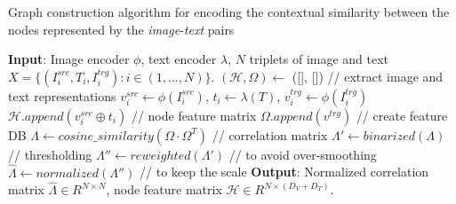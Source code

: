 \documentclass[10pt,twocolumn,letterpaper]{article}
\begin{document}
\begin{algorithm}
	\caption{Graph construction algorithm for encoding the contextual similarity between the nodes represented by the \textit{image}-\textit{text} pairs} 
	\begin{algorithmic}[1]
	    \State \textbf{Input}: Image encoder $\phi$, text encoder $\lambda$, $N$ triplets of image and text $X = \{(I^{src}_i, T_i, I^{trg}_i) : i \in (1,...,N) \}$.
	    \State $(\mathcal{H}, \Omega) \leftarrow$ ([], [])
	        \State \textcolor{light-gray}{// extract image and text representations}
	        \State $v^{src}_i \leftarrow \phi(I^{src}_i)$, $t_i \leftarrow \lambda(T)$, $v^{trg}_i \leftarrow \phi(I^{trg}_i)$
	        \State $\mathcal{H}.append(v^{src}_i \oplus t_i)$ \textcolor{light-gray}{// node feature matrix}      
	        \State $\Omega.append(v^{trg})$ \textcolor{light-gray}{// create feature DB}
	    \EndFor
	    \State $\Lambda \leftarrow cosine\_similarity(\Omega \cdot \Omega^T)$ \textcolor{light-gray}{// correlation matrix}
	    \State $\Lambda' \leftarrow binarized(\Lambda)$ \textcolor{light-gray}{// thresholding}
	    \State $\Lambda'' \leftarrow reweighted(\Lambda')$ \textcolor{light-gray}{// to avoid over-smoothing}
	    \State $\hat{\Lambda} \leftarrow normalized(\Lambda'')$ \textcolor{light-gray}{// to keep the scale}
	    \State \textbf{Output}: Normalized correlation matrix $\hat{\Lambda} \in R^{N \times N}$, node feature matrix $\mathcal{H} \in R^{N \times (D_V + D_T)}$.
	\end{algorithmic}
	\label{algo:graph_construction}
\end{algorithm}
\end{document}
